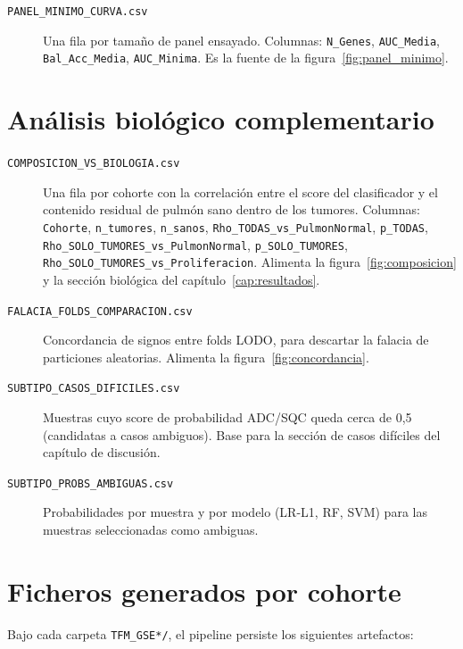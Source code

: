 \begin{description}
  \item[\texttt{PANEL\_MINIMO\_CURVA.csv}] Una fila por tamaño de panel
  ensayado. Columnas: \texttt{N\_Genes}, \texttt{AUC\_Media},
  \texttt{Bal\_Acc\_Media}, \texttt{AUC\_Minima}. Es la fuente de la
  figura~\ref{fig:panel_minimo}.
\end{description}

\section*{Análisis biológico complementario}
{}

\begin{description}
  \item[\texttt{COMPOSICION\_VS\_BIOLOGIA.csv}] Una fila por cohorte con
  la correlación entre el score del clasificador y el contenido residual
  de pulmón sano dentro de los tumores. Columnas: \texttt{Cohorte},
  \texttt{n\_tumores}, \texttt{n\_sanos}, \texttt{Rho\_TODAS\_vs\_PulmonNormal},
  \texttt{p\_TODAS}, \texttt{Rho\_SOLO\_TUMORES\_vs\_PulmonNormal},
  \texttt{p\_SOLO\_TUMORES}, \texttt{Rho\_SOLO\_TUMORES\_vs\_Proliferacion}.
  Alimenta la figura~\ref{fig:composicion} y la sección biológica del
  capítulo~\ref{cap:resultados}.

  \item[\texttt{FALACIA\_FOLDS\_COMPARACION.csv}] Concordancia de signos
  entre folds LODO, para descartar la falacia de particiones aleatorias.
  Alimenta la figura~\ref{fig:concordancia}.

  \item[\texttt{SUBTIPO\_CASOS\_DIFICILES.csv}] Muestras cuyo score de
  probabilidad ADC/SQC queda cerca de 0,5 (candidatas a casos ambiguos).
  Base para la sección de casos difíciles del capítulo de discusión.

  \item[\texttt{SUBTIPO\_PROBS\_AMBIGUAS.csv}] Probabilidades por muestra
  y por modelo (LR-L1, RF, SVM) para las muestras seleccionadas como
  ambiguas.
\end{description}

\section*{Ficheros generados por cohorte}
{}

Bajo cada carpeta \texttt{TFM\_GSE*/}, el pipeline persiste los
siguientes artefactos:


